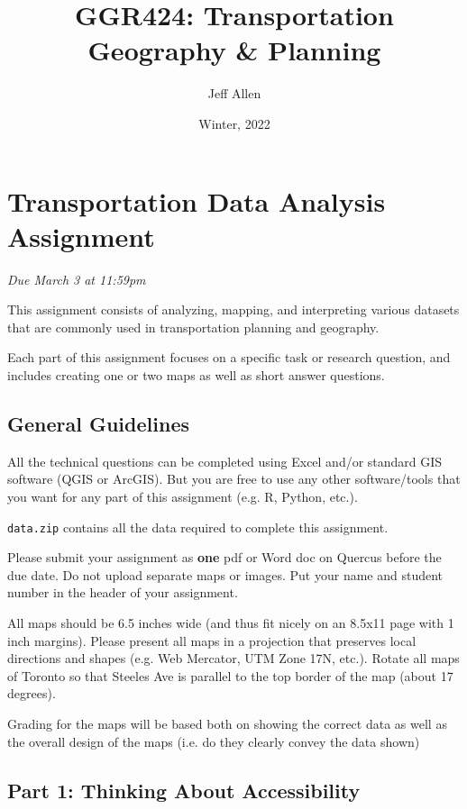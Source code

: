 \documentclass[11pt]{article}
\title{\textbf{GGR424: Transportation Geography \& Planning}}
\author{Jeff Allen}
\date{Winter, 2022}
\begin{document}
	\allsectionsfont{\sffamily}
	
	\section*{Transportation Data Analysis Assignment} 
		
	\textit{Due March 3 at 11:59pm}
	
	\vspace{3mm}
	
	This assignment consists of analyzing, mapping, and interpreting various datasets that are commonly used in transportation planning and geography. 
	
	Each part of this assignment focuses on a specific task or research question, and includes creating one or two maps as well as short answer questions.
	
	
	
	
	
	
	\subsection*{General Guidelines}

	
	All the technical questions can be completed using Excel and/or standard GIS software (QGIS or ArcGIS). But you are free to use any other software/tools that you want for any part of this assignment (e.g. R, Python, etc.).
	
	\texttt{data.zip} contains all the data required to complete this assignment.
	
	Please submit your assignment as \textbf{one} pdf or Word doc on Quercus before the due date. Do not upload separate maps or images. Put your name and student number in the header of your assignment.
	
	All maps should be 6.5 inches wide (and thus fit nicely on an 8.5x11 page with 1 inch margins). Please present all maps in a projection that preserves local directions and shapes (e.g. Web Mercator, UTM Zone 17N, etc.). Rotate all maps of Toronto so that Steeles Ave is parallel to the top border of the map (about 17 degrees).
	
	Grading for the maps will be based both on showing the correct data as well as the overall design of the maps (i.e. do they clearly convey the data shown)
	
			
			
	
	
	
	\subsection*{Part 1: Thinking About Accessibility} 
	
\end{document}
